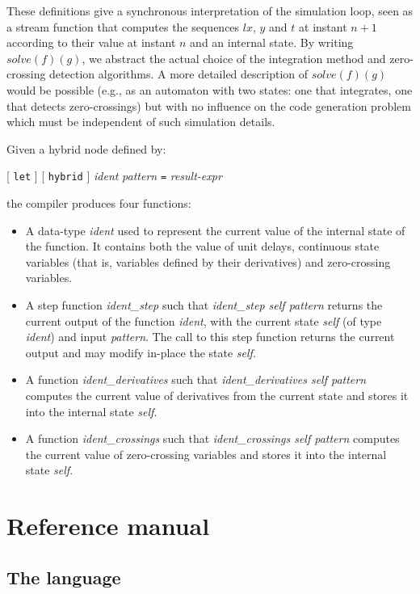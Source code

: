 \documentclass[11pt,titlepage,twoside]{report}
\newcommand{\lx}{\ensuremath{\mathit{lx}}}
\newcommand{\Solve}[2]{\mathit{solve}({#1})({#2})}
\newcommand{\term}[1]{{\tt #1}}
\newcommand{\nterm}[1]{{\em #1}}
\begin{document}
These definitions give a synchronous interpretation of the simulation loop,
seen as a stream function that computes the sequences $\lx$, $y$ and $t$
at instant $n+1$ according to their value at instant $n$ and an
internal state. By writing $\Solve{f}{g}$, we abstract the
actual choice of the integration method and zero-crossing detection
algorithms. A more detailed description of $\Solve{f}{g}$ would be
possible (e.g., as an automaton with two states: one that integrates, one 
that detects zero-crossings) but with no influence on
the code generation problem which must be independent of such simulation
details. 


Given a hybrid node defined by:
\begin{center}
  [ \term{let} ] [ \term{hybrid} ] \nterm{ident} \nterm{pattern} \term{=}
  \nterm{result-expr}
\end{center}
the compiler produces four functions:

\begin{itemize}
\item
  A data-type \nterm{ident} used to represent the current
  value of the internal state of the function. It contains both the
  value of unit delays, continuous state variables (that is, variables
  defined by their derivatives) and zero-crossing variables.
\item
  A step function \nterm{ident\_step} such that
    \nterm{ident\_step self pattern} returns the current output of the function
    \nterm{ident}, with the current state \nterm{self} (of type
    \nterm{ident}) and input \nterm{pattern}. The call to this step
    function returns the current output and may modify in-place
    the state \nterm{self}.
  \item
    A function \nterm{ident\_derivatives} such that
    \nterm{ident\_derivatives self pattern} computes the
    current value of derivatives from the current state and stores it
    into the internal state \nterm{self}.
  \item
    A function \nterm{ident\_crossings} such that
    \nterm{ident\_crossings self pattern} computes the
    current value of zero-crossing variables and stores it into the
    internal state \nterm{self}. 
\end{itemize}

\cleardoublepage
\part{Reference manual\label{refman}}
\cleardoublepage
\chapter{The language\label{language}} %
\end{document}
